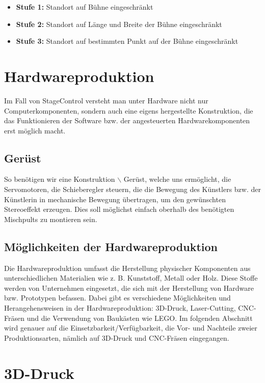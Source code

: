 \begin{itemize}
	\item \textbf{Stufe 1: }Standort auf Bühne eingeschränkt
	\item \textbf{Stufe 2: }Standort auf Länge und Breite der Bühne eingeschränkt
	\item \textbf{Stufe 3: }Standort auf bestimmten Punkt auf der Bühne eingeschränkt
\end{itemize}

\section{Hardwareproduktion }
Im Fall von StageControl versteht man unter Hardware nicht nur Computerkomponenten, sondern auch eine eigens hergestellte Konstruktion, die das Funktionieren der Software bzw. der angesteuerten Hardwarekomponenten erst möglich macht.

\subsection{Gerüst}
So benötigen wir eine Konstruktion $\backslash$ Gerüst, welche uns ermöglicht, die Servomotoren, die Schieberegler steuern, die die Bewegung des Künstlers bzw. der Künstlerin in mechanische Bewegung übertragen, um den gewünschten Stereoeffekt erzeugen. Dies soll möglichst einfach oberhalb des benötigten Mischpults zu montieren sein.


\subsection{Möglichkeiten der Hardwareproduktion}
Die Hardwareproduktion umfasst die Herstellung physischer Komponenten aus unterschiedlichen Materialien wie z. B. Kunststoff, Metall oder Holz. Diese Stoffe werden von Unternehmen eingesetzt, die sich mit der Herstellung von Hardware bzw. Prototypen befassen. Dabei gibt es verschiedene Möglichkeiten und Herangehensweisen in der Hardwareproduktion: 3D-Druck, Laser-Cutting, CNC-Fräsen und die Verwendung von Baukästen wie LEGO. Im folgenden Abschnitt wird genauer auf die Einsetzbarkeit/Verfügbarkeit, die Vor- und Nachteile zweier Produktionsarten, nämlich auf 3D-Druck und CNC-Fräsen eingegangen.

\section{3D-Druck}
